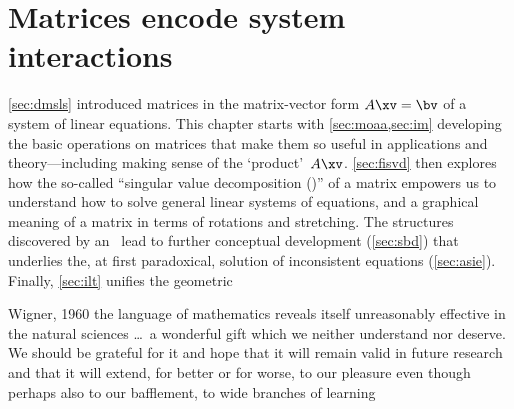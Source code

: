 
\chapter{Matrices encode system interactions}
\label{ch:m}

\minitoc




\cref{sec:dmsls} introduced matrices in the matrix-vector form \(A\xv=\bv\) of a system of linear equations.
This chapter starts with \cref{sec:moaa,sec:im} developing the basic operations on matrices that make them so useful in applications and theory---including making sense of the `product'~\(A\xv\).
\cref{sec:fisvd} then explores how the so-called ``singular value decomposition (\svd)'' of a matrix empowers us to understand how to solve general linear systems of equations, and a graphical meaning of a matrix in terms of rotations and stretching.
The structures discovered by an \svd\ lead to further conceptual development (\cref{sec:sbd}) that underlies the, at first paradoxical, solution of inconsistent equations (\cref{sec:asie}).
Finally, \cref{sec:ilt} unifies the geometric 



\begin{quoted}{Wigner, 1960 \cite[p.3]{Mandelbrot1982}}
the language of mathematics reveals itself unreasonably effective in the natural sciences \ldots\ a wonderful gift which we neither understand nor deserve.  We should be grateful for it and hope that it will remain valid in future research and that it will extend, for better or for worse, to our pleasure even though perhaps also to our bafflement, to wide branches of learning
\end{quoted}



\endinput
